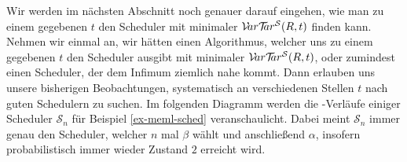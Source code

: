 \documentclass[a4paper]{article}
\theoremstyle{nonumberplain}
\begin{document}
Wir werden im nächsten Abschnitt noch genauer darauf eingehen, wie man zu einem gegebenen $t$ den Scheduler mit minimaler \vt{} $\mathcal{V}\!ar \mathcal{T}\!\!ar^{\mathcal{S}}(R,t)$ finden kann.
Nehmen wir einmal an, wir hätten einen Algorithmus, welcher uns zu einem gegebenen $t$ den Scheduler ausgibt mit minimaler \vt{} $\mathcal{V}\!ar \mathcal{T}\!\!ar^{\mathcal{S}}(R,t)$, oder zumindest einen Scheduler, der dem Infimum ziemlich nahe kommt. Dann erlauben uns unsere bisherigen Beobachtungen, systematisch an verschiedenen Stellen $t$ nach guten Schedulern zu suchen. Im folgenden Diagramm werden die \vt{}-Verläufe einiger Scheduler $\mathcal{S}_n$ für Beispiel \ref{ex-meml-sched} veranschaulicht. Dabei meint $\mathcal{S}_n$ immer genau den Scheduler, welcher $n$ mal $\beta$ wählt und anschließend $\alpha$, insofern probabilistisch immer wieder Zustand $2$ erreicht wird.
\end{document}
